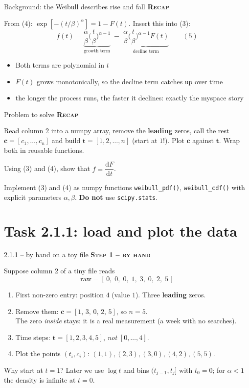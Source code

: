 \documentclass[aspectratio=169,11pt]{beamer}
\newcommand{\stage}[2]{{\color{#1}\bfseries\small\textsc{#2}}\par\smallskip}
\newcommand{\Byhand}{\stage{hand}{Step 1 -- by hand}}
\newcommand{\Given}{\stage{given}{Recap}}
\begin{document}
\begin{frame}{Background: the Weibull describes rise and fall}
\Given
From (4): $\exp[-(t/\beta)^\alpha]=1-F(t)$. Insert this into (3):
\[
f(t)=\underbrace{\frac{\alpha}{\beta}\Big(\frac t\beta\Big)^{\alpha-1}}_{\text{growth term}}
\;-\;\underbrace{\frac{\alpha}{\beta}\Big(\frac t\beta\Big)^{\alpha-1}F(t)}_{\text{decline term}}\qquad(5)
\]
\begin{itemize}
\item Both terms are polynomial in $t$
\item $F(t)$ grows monotonically, so the decline term catches up over time
\item[$\Rightarrow$] the longer the process runs, the faster it declines: exactly the myspace story
\end{itemize}
\end{frame}

\begin{frame}{Problem to solve}\small
\Given
\begin{description}[Task 2.1.1]
\item[Task 2.1.1] Read column 2 into a numpy array, remove the \textbf{leading} zeros, call the rest
$\bm c=[c_1,\dots,c_n]$ and build $\bm t=[1,2,\dots,n]$ (start at $1$!). Plot $\bm c$ against $\bm t$.
Wrap both in reusable functions.
\item[Mini ex.] Using (3) and (4), show that $f=\dfrac{\mathrm dF}{\mathrm dt}$.
\item[Task 2.1.2] Implement (3) and (4) as numpy functions \texttt{weibull\_pdf()}, \texttt{weibull\_cdf()}
with explicit parameters $\alpha,\beta$. \textbf{Do not} use \texttt{scipy.stats}.
\end{description}
\end{frame}

\section{Task 2.1.1: load and plot the data}

\begin{frame}{2.1.1 -- by hand on a toy file}\small
\Byhand
Suppose column 2 of a tiny file reads
\[
\text{raw}=[\,0,\;0,\;0,\;1,\;3,\;0,\;2,\;5\,]
\]
\begin{enumerate}
\item First non-zero entry: position $4$ (value $1$). Three \textbf{leading} zeros.
\item Remove them: $\bm c=[1,\,3,\,0,\,2,\,5]$, so $n=5$.\\
\quad The zero \emph{inside} stays: it is a real measurement (a week with no searches).
\item Time steps: $\bm t=[1,2,3,4,5]$, \emph{not} $[0,\dots,4]$.
\item Plot the points $(t_i,c_i)$: $(1,1),(2,3),(3,0),(4,2),(5,5)$.
\end{enumerate}
\medskip
\alert{Why start at $t=1$?} Later we use $\log t$ and bins $(t_{j-1},t_j]$ with $t_0=0$; for $\alpha<1$ the density is infinite at $t=0$.
\end{frame}
\end{document}

